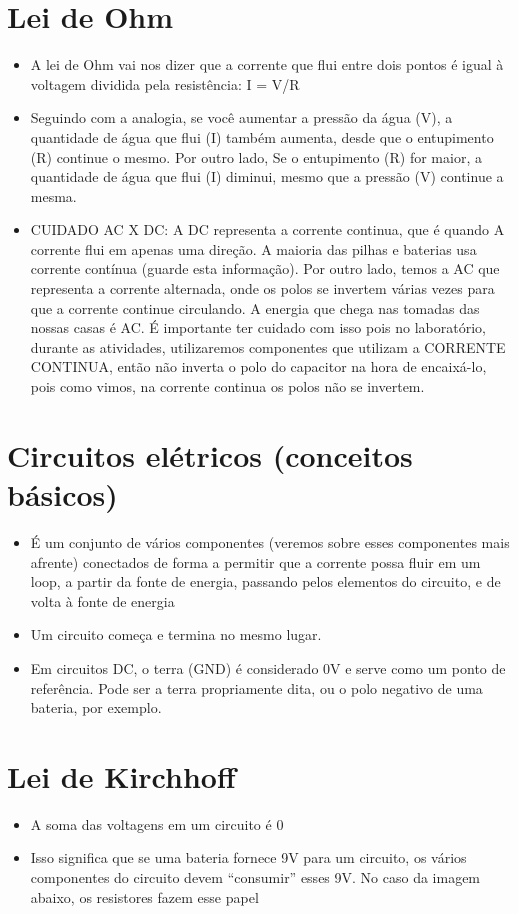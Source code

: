 \documentclass{report}
\begin{document}
	\section{Lei de Ohm}
	\begin{itemize}
		\item A lei de Ohm vai nos dizer que a corrente que flui entre dois pontos é igual à voltagem dividida pela resistência: I = V/R
		\item Seguindo com a analogia, se você aumentar a pressão da água (V), a quantidade de água que flui (I) também aumenta, desde que o entupimento (R) continue o mesmo. Por outro lado, Se o entupimento (R) for maior, a quantidade de água que flui (I) diminui, mesmo que a pressão (V) continue a mesma.
		\item CUIDADO AC X DC: A DC representa a corrente continua, que é quando A corrente flui em apenas uma direção. A maioria das pilhas e baterias usa corrente contínua (guarde esta informação). Por outro lado, temos a AC que representa a corrente alternada, onde os polos se invertem várias vezes para que a corrente continue circulando. A energia que chega nas tomadas das nossas casas é AC. É importante ter cuidado com isso pois no laboratório, durante as atividades, utilizaremos componentes que utilizam a CORRENTE CONTINUA, então não inverta o polo do capacitor na hora de encaixá-lo, pois como vimos, na corrente continua os polos não se invertem.
	\end{itemize}
	\section{Circuitos elétricos (conceitos básicos)}
	\begin{itemize}
		\item É um conjunto de vários componentes (veremos sobre esses componentes mais afrente) conectados de forma a permitir que a corrente possa fluir em um loop, a partir da fonte de energia, passando pelos elementos do circuito, e de volta à fonte de energia
		\item  Um circuito começa e termina no mesmo lugar.
		\item Em circuitos DC, o terra (GND) é considerado 0V e serve como um ponto de referência. Pode ser a terra propriamente dita, ou o polo negativo de uma bateria, por exemplo.
	\end{itemize}
	\section{Lei de Kirchhoff}
	\begin{itemize}
		\item A soma das voltagens em um circuito é 0
		\item Isso significa que se uma bateria fornece 9V para um circuito, os vários componentes do circuito devem “consumir” esses 9V. No caso da imagem abaixo, os resistores fazem esse papel
		
	\end{itemize}
	
\end{document}
